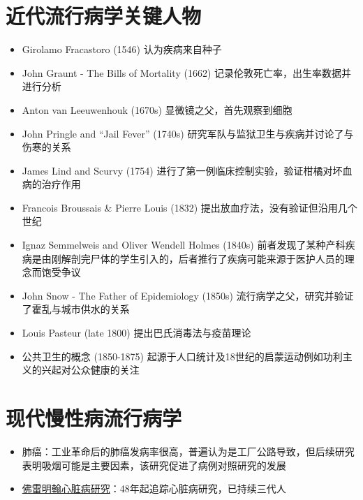 \documentclass[]{book}
\providecommand{\tightlist}{%
  \setlength{\itemsep}{0pt}\setlength{\parskip}{0pt}}
\begin{document}
\hypertarget{ux8fd1ux4ee3ux6d41ux884cux75c5ux5b66ux5173ux952eux4ebaux7269}{%
\section{近代流行病学关键人物}\label{ux8fd1ux4ee3ux6d41ux884cux75c5ux5b66ux5173ux952eux4ebaux7269}}

\begin{itemize}
\tightlist
\item
  Girolamo Fracastoro (1546) 认为疾病来自种子
\item
  John Graunt - The Bills of Mortality (1662) 记录伦敦死亡率，出生率数据并进行分析
\item
  Anton van Leeuwenhouk (1670s) 显微镜之父，首先观察到细胞
\item
  John Pringle and ``Jail Fever'' (1740s) 研究军队与监狱卫生与疾病并讨论了与伤寒的关系
\item
  James Lind and Scurvy (1754) 进行了第一例临床控制实验，验证柑橘对坏血病的治疗作用
\item
  Francois Broussais \& Pierre Louis (1832) 提出放血疗法，没有验证但沿用几个世纪
\item
  Ignaz Semmelweis and Oliver Wendell Holmes (1840s) 前者发现了某种产科疾病是由刚解剖完尸体的学生引入的，后者推行了疾病可能来源于医护人员的理念而饱受争议
\item
  John Snow - The Father of Epidemiology (1850s) 流行病学之父，研究并验证了霍乱与城市供水的关系
\item
  Louis Pasteur (late 1800) 提出巴氏消毒法与疫苗理论
\item
  公共卫生的概念 (1850-1875) 起源于人口统计及18世纪的启蒙运动例如功利主义的兴起对公众健康的关注
\end{itemize}

\hypertarget{ux73b0ux4ee3ux6162ux6027ux75c5ux6d41ux884cux75c5ux5b66}{%
\section{现代慢性病流行病学}\label{ux73b0ux4ee3ux6162ux6027ux75c5ux6d41ux884cux75c5ux5b66}}

\begin{itemize}
\tightlist
\item
  肺癌：工业革命后的肺癌发病率很高，普遍认为是工厂公路导致，但后续研究表明吸烟可能是主要因素，该研究促进了病例对照研究的发展
\item
  \href{http://www.framinghamheartstudy.org/}{佛雷明翰心脏病研究}：48年起追踪心脏病研究，已持续三代人
\end{itemize}
\end{document}
